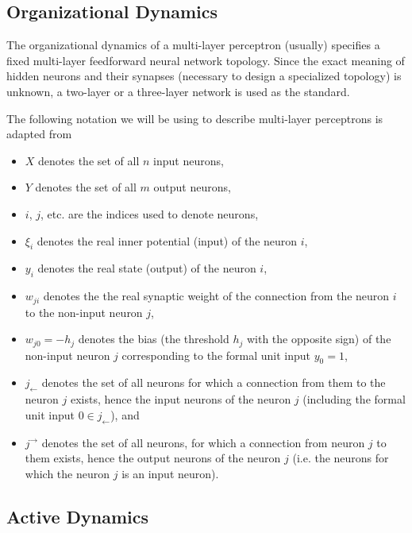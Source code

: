 \subsection{Organizational Dynamics}

The organizational dynamics of a multi-layer perceptron (usually) specifies a fixed multi-layer feedforward neural network topology. Since the exact meaning of hidden neurons and their synapses (necessary to design a specialized topology) is unknown, a two-layer or a three-layer network is used as the standard.

The following notation we will be using to describe multi-layer perceptrons is adapted from %

\begin{itemize}
\item $X$ denotes the set of all $n$ input neurons,
\item $Y$ denotes the set of all $m$ output neurons,
\item $i$, $j$, etc. are the indices used to denote neurons,
\item $\xi_i$ denotes the real inner potential (input) of the neuron $i$,
\item $y_i$ denotes the real state (output) of the neuron $i$,
\item $w_{ji}$ denotes the the real synaptic weight of the connection from the neuron $i$ to the non-input neuron $j$,
\item $w_{j0} = -h_j$ denotes the bias (the threshold $h_j$ with the opposite sign) of the non-input neuron $j$ corresponding to the formal unit input $y_0 = 1$,
\item $j_\leftarrow$ denotes the set of all neurons for which a connection from them to the neuron $j$ exists, hence the input neurons of the neuron $j$ (including the formal unit input $0 \in j_\leftarrow$), and
\item $j^\rightarrow$ denotes the  set of all neurons, for which a connection from neuron $j$ to them exists, hence the output neurons of the neuron $j$ (i.e. the neurons for which the neuron $j$ is an input neuron).
\end{itemize}

\subsection{Active Dynamics}

